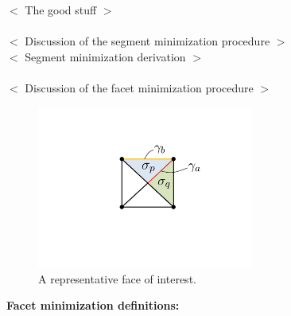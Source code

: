 \documentclass[11pt]{article} %
\begin{document}
$<$ The good stuff $>$
\\\\
$<$ Discussion of the segment minimization procedure $>$
\\
$<$ Segment minimization derivation $>$
\\\\
$<$ Discussion of the facet minimization procedure $>$
\\
\begin{figure} [!ht]
	\centering
	\includegraphics[width = 2.8in,trim=170 190 170 120,clip=true]{facetMinImage.pdf}
	\caption{A representative face of interest.}
	\label{fig:facetMin}
\end{figure}
\begin{center}
\textbf{Facet minimization definitions:}
\end{center}
\end{document}
